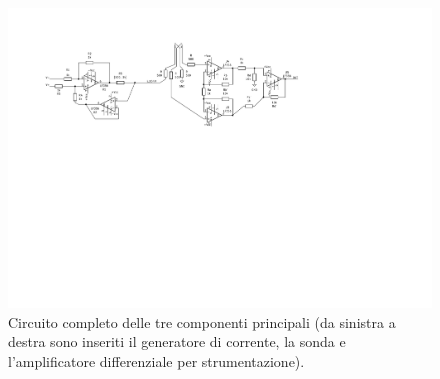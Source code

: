 \documentclass[fleqn,varvw]{memo}
\begin{document}
\begin{turnpage}
    \begin{figure}[p]
        \centering
        \includegraphics[width=\linewidth,trim={2.5cm 12.5cm 8cm 2cm},clip]{SCHEMA_full1.pdf}
        \caption{Circuito completo delle tre componenti principali (da sinistra a destra sono inseriti il generatore di corrente, la sonda e l'amplificatore differenziale per strumentazione).}\label{fig:circuit_memo2}
    \end{figure}
\end{turnpage}
\end{document}
